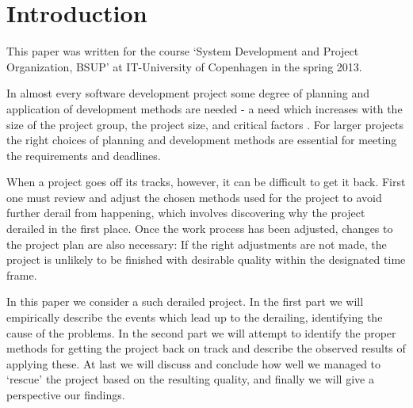 \section{Introduction}
This paper was written for the course `System Development and Project Organization, BSUP' at IT-University of Copenhagen in the spring 2013.

In almost every software development project some degree of planning and application of development methods are needed - a need which increases with the size of the project group, the project size, and critical factors \cite[p. 134]{ac}. For larger projects the right choices of planning and development methods are essential for meeting the requirements and deadlines.

When a project goes off its tracks, however, it can be difficult to get it back. First one must review and adjust the chosen methods used for the project to avoid further derail from happening, which involves discovering why the project derailed in the first place.
Once the work process has been adjusted, changes to the project plan are also necessary: If the right adjustments are not made, the project is unlikely to be finished with desirable quality within the designated time frame.

In this paper we consider a such derailed project.
In the first part we will empirically describe the events which lead up to the derailing, identifying the cause of the problems. In the second part we will attempt to identify the proper methods for getting the project back on track and describe the observed results of applying these. At last we will discuss and conclude how well we managed to `rescue' the project based on the resulting quality, and finally we will give a perspective our findings.
\newpage